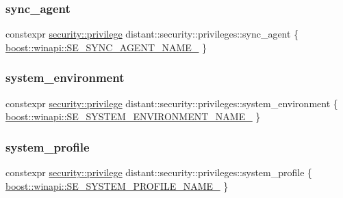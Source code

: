 \mbox{\label{namespacedistant_1_1security_1_1privileges_a25a7ae4b1a3c96183205f39a3a5997b2}} 
\subsubsection{\texorpdfstring{sync\+\_\+agent}{sync\_agent}}
{\footnotesize\ttfamily constexpr \mbox{\hyperlink{classdistant_1_1security_1_1privilege}{security\+::privilege}} distant\+::security\+::privileges\+::sync\+\_\+agent \{ \mbox{\hyperlink{namespaceboost_1_1winapi_a6cfe2bda14b699274aad9bf64c4d4bc6}{boost\+::winapi\+::\+S\+E\+\_\+\+S\+Y\+N\+C\+\_\+\+A\+G\+E\+N\+T\+\_\+\+N\+A\+M\+E\+\_\+}} \}}

\mbox{\label{namespacedistant_1_1security_1_1privileges_a49502a27a41cc1f1f07b54bde8b0d3c5}} 
\subsubsection{\texorpdfstring{system\+\_\+environment}{system\_environment}}
{\footnotesize\ttfamily constexpr \mbox{\hyperlink{classdistant_1_1security_1_1privilege}{security\+::privilege}} distant\+::security\+::privileges\+::system\+\_\+environment \{ \mbox{\hyperlink{namespaceboost_1_1winapi_ae7a5b94d22e342ee8040621457878524}{boost\+::winapi\+::\+S\+E\+\_\+\+S\+Y\+S\+T\+E\+M\+\_\+\+E\+N\+V\+I\+R\+O\+N\+M\+E\+N\+T\+\_\+\+N\+A\+M\+E\+\_\+}} \}}

\mbox{\label{namespacedistant_1_1security_1_1privileges_ae5dcc8b9153fc5d5c239bf3618cd9ad5}} 
\subsubsection{\texorpdfstring{system\+\_\+profile}{system\_profile}}
{\footnotesize\ttfamily constexpr \mbox{\hyperlink{classdistant_1_1security_1_1privilege}{security\+::privilege}} distant\+::security\+::privileges\+::system\+\_\+profile \{ \mbox{\hyperlink{namespaceboost_1_1winapi_ace7945d1525332019ae9feffb1fd5d59}{boost\+::winapi\+::\+S\+E\+\_\+\+S\+Y\+S\+T\+E\+M\+\_\+\+P\+R\+O\+F\+I\+L\+E\+\_\+\+N\+A\+M\+E\+\_\+}} \}}


